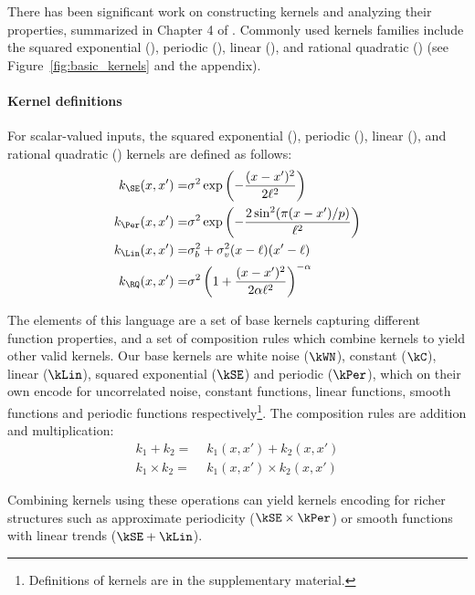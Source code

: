 There has been significant work on constructing \gp{} kernels and analyzing their properties, summarized in Chapter 4 of \cite{rasmussen38gaussian}. 
%
Commonly used kernels families include the squared exponential (\kSE), periodic (\kPer), linear (\kLin), and rational quadratic (\kRQ) (see Figure~\ref{fig:basic_kernels} and the appendix).
%

\paragraph{Kernel definitions}
For scalar-valued inputs, the squared exponential (\kSE), periodic (\kPer), linear (\kLin), and rational quadratic (\kRQ) kernels are defined as follows:
%
\begin{eqnarray*}
\kernel_{\SE}(\inputVar, \inputVar') =& \sigma^2\exp\left(-\frac{(\inputVar - \inputVar')^2}{2\ell^2}\right) \\
\kernel_{\Per}(\inputVar, \inputVar') =& \sigma^2\exp\left(-\frac{2\sin^2 (\pi(\inputVar - \inputVar')/p)}{\ell^2}\right) \\
\kernel_{\Lin}(\inputVar, \inputVar') =& \sigma_b^2 + \sigma_v^2(\inputVar - \ell)(\inputVar' - \ell) \\
\kernel_{\RQ}(\inputVar, \inputVar') =& \sigma^2\left( 1 + \frac{(\inputVar - \inputVar')^2}{2 \alpha \ell^2} \right)^{-\alpha}
\end{eqnarray*}



The elements of this language are a set of  base
kernels capturing different function properties, and a set of
composition rules which combine kernels to yield other valid kernels.
Our base kernels are white noise ($\kWN$), constant ($\kC$), linear ($\kLin$), squared exponential ($\kSE$) and periodic ($\kPer$), which on their own encode for uncorrelated noise, constant functions, linear functions, smooth functions and periodic functions respectively\footnote{Definitions of kernels are in the supplementary material.}.
The composition rules are addition and multiplication:
\begin{align}
k_1 + k_2 =& \,\, k_1(x,x') + k_2(x,x')\\
k_1 \times k_2 =& \,\, k_1(x,x') \times k_2(x,x')
\end{align}

Combining kernels using these operations can yield kernels encoding for richer structures such as approximate periodicity ($\kSE \times \kPer$) or smooth functions with linear trends ($\kSE + \kLin$).


